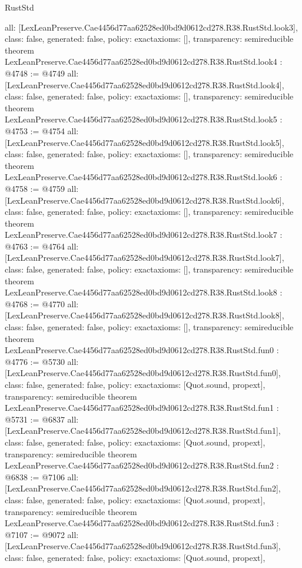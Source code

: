 \begin{lexlean}{RustStd}
\begin{coremodule}
{  all: [LexLeanPreserve.Cae4456d77aa62528ed0bd9d0612cd278.R38.RustStd.look3],
  class: false,
  generated: false,
  policy: exact{axioms: []},
  transparency: semireducible
}
theorem LexLeanPreserve.Cae4456d77aa62528ed0bd9d0612cd278.R38.RustStd.look4 : @4748 := @4749 {
  all: [LexLeanPreserve.Cae4456d77aa62528ed0bd9d0612cd278.R38.RustStd.look4],
  class: false,
  generated: false,
  policy: exact{axioms: []},
  transparency: semireducible
}
theorem LexLeanPreserve.Cae4456d77aa62528ed0bd9d0612cd278.R38.RustStd.look5 : @4753 := @4754 {
  all: [LexLeanPreserve.Cae4456d77aa62528ed0bd9d0612cd278.R38.RustStd.look5],
  class: false,
  generated: false,
  policy: exact{axioms: []},
  transparency: semireducible
}
theorem LexLeanPreserve.Cae4456d77aa62528ed0bd9d0612cd278.R38.RustStd.look6 : @4758 := @4759 {
  all: [LexLeanPreserve.Cae4456d77aa62528ed0bd9d0612cd278.R38.RustStd.look6],
  class: false,
  generated: false,
  policy: exact{axioms: []},
  transparency: semireducible
}
theorem LexLeanPreserve.Cae4456d77aa62528ed0bd9d0612cd278.R38.RustStd.look7 : @4763 := @4764 {
  all: [LexLeanPreserve.Cae4456d77aa62528ed0bd9d0612cd278.R38.RustStd.look7],
  class: false,
  generated: false,
  policy: exact{axioms: []},
  transparency: semireducible
}
theorem LexLeanPreserve.Cae4456d77aa62528ed0bd9d0612cd278.R38.RustStd.look8 : @4768 := @4770 {
  all: [LexLeanPreserve.Cae4456d77aa62528ed0bd9d0612cd278.R38.RustStd.look8],
  class: false,
  generated: false,
  policy: exact{axioms: []},
  transparency: semireducible
}
theorem LexLeanPreserve.Cae4456d77aa62528ed0bd9d0612cd278.R38.RustStd.fun0 : @4776 := @5730 {
  all: [LexLeanPreserve.Cae4456d77aa62528ed0bd9d0612cd278.R38.RustStd.fun0],
  class: false,
  generated: false,
  policy: exact{axioms: [Quot.sound, propext]},
  transparency: semireducible
}
theorem LexLeanPreserve.Cae4456d77aa62528ed0bd9d0612cd278.R38.RustStd.fun1 : @5731 := @6837 {
  all: [LexLeanPreserve.Cae4456d77aa62528ed0bd9d0612cd278.R38.RustStd.fun1],
  class: false,
  generated: false,
  policy: exact{axioms: [Quot.sound, propext]},
  transparency: semireducible
}
theorem LexLeanPreserve.Cae4456d77aa62528ed0bd9d0612cd278.R38.RustStd.fun2 : @6838 := @7106 {
  all: [LexLeanPreserve.Cae4456d77aa62528ed0bd9d0612cd278.R38.RustStd.fun2],
  class: false,
  generated: false,
  policy: exact{axioms: [Quot.sound, propext]},
  transparency: semireducible
}
theorem LexLeanPreserve.Cae4456d77aa62528ed0bd9d0612cd278.R38.RustStd.fun3 : @7107 := @9072 {
  all: [LexLeanPreserve.Cae4456d77aa62528ed0bd9d0612cd278.R38.RustStd.fun3],
  class: false,
  generated: false,
  policy: exact{axioms: [Quot.sound, propext]},
}
\end{coremodule}
\end{lexlean}
